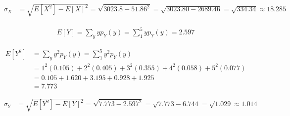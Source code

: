 \documentclass[12pt]{report}
\begin{document}
\begin{enumerate}
    \begin{align*}
      \sigma_X &= \sqrt{E\left[ X^2 \right] - E[X]^2} = \sqrt{3023.8 - 51.86^2} = \sqrt{3023.80 - 2689.46} = \sqrt{334.34} \approx 18.285 
    \end{align*}

    \begin{align*}
      E[Y] = \sum_y yp_Y(y) = \sum_1^5 yp_Y(y) = 2.597
    \end{align*}

    \begin{align*}
      E\left[ Y^2 \right] &= \sum_y y^2p_Y(y) = \sum_1^5 y^2p_Y(y) \\
      &= 1^2(0.105) + 2^2(0.405) + 3^2(0.355) + 4^2(0.058) + 5^2(0.077) \\
      &= 0.105 + 1.620 + 3.195 + 0.928 + 1.925 \\
      &= 7.773
    \end{align*}

    \begin{align*}
      \sigma_Y &= \sqrt{E\left[ Y^2 \right] - E[Y]^2} = \sqrt{7.773 - 2.597^2} = \sqrt{7.773 - 6.744} = \sqrt{1.029} \approx 1.014
    \end{align*}


\end{enumerate}
\end{document}
